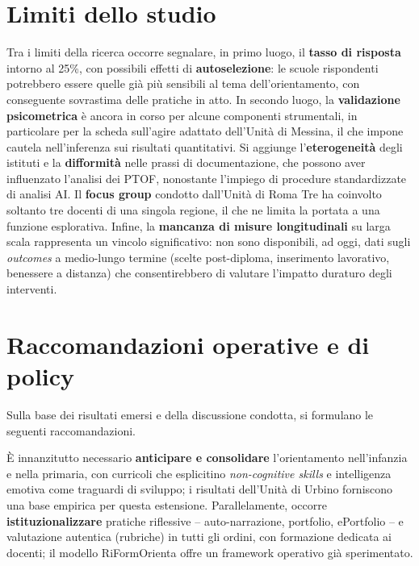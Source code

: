 \documentclass[12pt,a4paper]{article}
\begin{document}
\section{Limiti dello studio}

Tra i limiti della ricerca occorre segnalare, in primo luogo, il \textbf{tasso di risposta} intorno al 25\%, con possibili effetti di \textbf{autoselezione}: le scuole rispondenti potrebbero essere quelle gi\`a pi\`u sensibili al tema dell'orientamento, con conseguente sovrastima delle pratiche in atto. In secondo luogo, la \textbf{validazione psicometrica} \`e ancora in corso per alcune componenti strumentali, in particolare per la scheda sull'agire adattato dell'Unit\`a di Messina, il che impone cautela nell'inferenza sui risultati quantitativi. Si aggiunge l'\textbf{eterogeneit\`a} degli istituti e la \textbf{difformit\`a} nelle prassi di documentazione, che possono aver influenzato l'analisi dei PTOF, nonostante l'impiego di procedure standardizzate di analisi AI. Il \textbf{focus group} condotto dall'Unit\`a di Roma Tre ha coinvolto soltanto tre docenti di una singola regione, il che ne limita la portata a una funzione esplorativa. Infine, la \textbf{mancanza di misure longitudinali} su larga scala rappresenta un vincolo significativo: non sono disponibili, ad oggi, dati sugli \textit{outcomes} a medio-lungo termine (scelte post-diploma, inserimento lavorativo, benessere a distanza) che consentirebbero di valutare l'impatto duraturo degli interventi.


\section{Raccomandazioni operative e di policy}

Sulla base dei risultati emersi e della discussione condotta, si formulano le seguenti raccomandazioni.

\`E innanzitutto necessario \textbf{anticipare e consolidare} l'orientamento nell'infanzia e nella primaria, con curricoli che esplicitino \textit{non-cognitive skills} e intelligenza emotiva come traguardi di sviluppo; i risultati dell'Unit\`a di Urbino forniscono una base empirica per questa estensione. Parallelamente, occorre \textbf{istituzionalizzare} pratiche riflessive -- auto-narrazione, portfolio, ePortfolio -- e valutazione autentica (rubriche) in tutti gli ordini, con formazione dedicata ai docenti; il modello RiFormOrienta offre un framework operativo gi\`a sperimentato.
\end{document}
